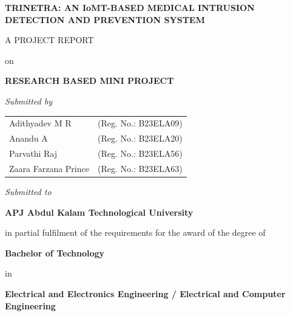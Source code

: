 \documentclass[12pt,a4paper]{report}
\begin{document}
\begin{titlepage}
    \centering
    \vspace*{0.5cm}
    
    {\large \bfseries TRINETRA: AN IoMT-BASED MEDICAL INTRUSION\\ DETECTION AND PREVENTION SYSTEM\par}
    \vspace{0.8cm}
    
    {\normalsize A PROJECT REPORT\par}
    \vspace{0.2cm}
    {\normalsize on\par}
    \vspace{0.2cm}
    {\large \bfseries RESEARCH BASED MINI PROJECT\par}
    \vspace{0.8cm}
    
    {\normalsize \textit{Submitted by}\par}
    \vspace{0.4cm}
    {\bfseries
    \begin{tabular}{ll}
        Adithyadev M R & (Reg. No.: B23ELA09) \\
        Anandu A & (Reg. No.: B23ELA20) \\
        Parvathi Raj & (Reg. No.: B23ELA56) \\
        Zaara Farzana Prince & (Reg. No.: B23ELA63) \\
    \end{tabular}\par}
    
    \vspace{0.8cm}
    {\normalsize \textit{Submitted to}\par}
    \vspace{0.3cm}
    {\large \bfseries APJ Abdul Kalam Technological University\par}
    \vspace{0.3cm}
    {\normalsize in partial fulfilment of the requirements for the award of the degree of\par}
    \vspace{0.3cm}
    {\large \bfseries Bachelor of Technology\par}
    \vspace{0.2cm}
    {\normalsize in\par}
    \vspace{0.2cm}
    {\bfseries Electrical and Electronics Engineering / Electrical and Computer Engineering\par}
    

\end{titlepage}
\end{document}
